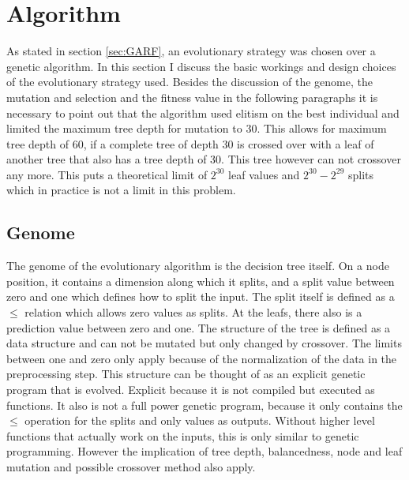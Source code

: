 \documentclass[conference]{IEEEtran}
\begin{document}
\section{Algorithm}
As stated in section \ref{sec:GARF}, an evolutionary strategy was chosen over a genetic algorithm. In this section I discuss the basic workings and design choices of the evolutionary strategy used. Besides the discussion of the genome, the mutation and selection and the fitness value in the following paragraphs it is necessary to point out that the algorithm used elitism on the best individual and limited the maximum tree depth for mutation to 30. This allows for maximum tree depth of 60, if a complete tree of depth 30 is crossed over with a leaf of another tree that also has a tree depth of 30. This tree however can not crossover any more.
This puts a theoretical limit of $2^{30}$ leaf values and $2^{30} - 2^{29}$ splits which in practice is not a limit in this problem.\\

\subsection{Genome}
The genome of the evolutionary algorithm is the decision tree itself.
On a node position, it contains a dimension along which it splits, and a split value between zero and one which defines how to split the input. The split itself is defined as a $\leq$ relation which allows zero values as splits. 
At the leafs, there also is a prediction value between zero and one. The structure of the tree is defined as a data structure and can not be mutated but only changed by crossover. The limits between one and zero only apply because of the normalization of the data in the preprocessing step.
This structure can be thought of as an explicit genetic program that is evolved. Explicit because it is not compiled but executed as functions. It also is not a full power genetic program, because it only contains the $\leq$ operation for the splits and only values as outputs. Without higher level functions that actually work on the inputs, this is only similar to genetic programming. However the implication of tree depth, balancedness, node and leaf mutation and possible crossover method also apply.
\end{document}
